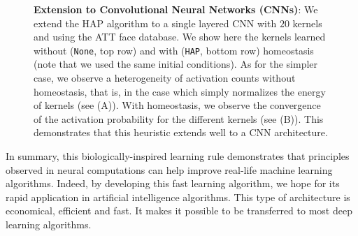 \documentclass[draft]{article} %
\newcommand{\seeFig}[1]{Figure~\ref{fig:#1}}%
\begin{document}
\begin{figure}%
\caption{
{\bf Extension to Convolutional Neural Networks (CNNs)}: %
 We extend the HAP algorithm to a single layered CNN with $20$ kernels and using the ATT face database. We show here the kernels learned without (\texttt{None}, top row) and with (\texttt{HAP}, bottom row) homeostasis (note that we used the same initial conditions). As for the simpler case, we observe a heterogeneity of activation counts without homeostasis, that is, in the case which simply normalizes the energy of kernels (see {\sf (A)}). With homeostasis, we observe the convergence of the activation probability for the different kernels (see {\sf (B)}). This demonstrates that this heuristic extends well to a CNN architecture.
\label{fig:CNN}}%
\end{figure}%
In summary, this biologically-inspired learning rule demonstrates that principles observed in neural computations can help improve real-life machine learning algorithms. Indeed, by developing this fast learning algorithm, we hope for its rapid application in artificial intelligence algorithms. This type of architecture is economical, efficient and fast. It makes it possible to be transferred to most deep learning algorithms.  %
\end{document}
